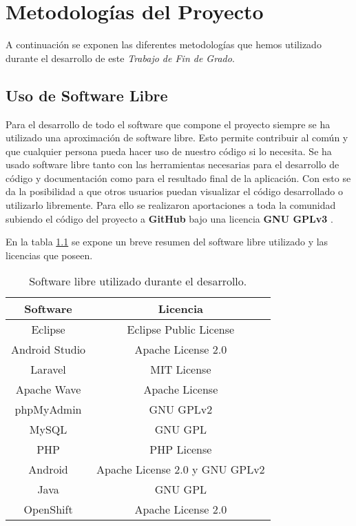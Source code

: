 \newpage
\thispagestyle{sectioned}
\chapter{Metodologías del Proyecto}

A continuación se exponen las diferentes metodologías que hemos utilizado durante el desarrollo de este \textit{Trabajo de Fin de Grado}.

\section{Uso de Software Libre}

Para el desarrollo de todo el software que compone el proyecto siempre se ha utilizado una aproximación de software libre. Esto permite contribuir al común y que cualquier persona pueda hacer uso de nuestro código si lo necesita. Se ha usado software libre tanto con las herramientas necesarias para el desarrollo de código y documentación como para el resultado final de la aplicación. Con esto se da la posibilidad a que otros usuarios puedan visualizar el código desarrollado o utilizarlo libremente. Para ello se realizaron aportaciones a toda la comunidad subiendo el código del proyecto a \textbf{GitHub} bajo una licencia \textbf{GNU GPLv3} \cite{ref:GPLv3}.

En la tabla \ref{fig:tableLicenses} se expone un breve resumen del software libre utilizado y las licencias que poseen.

\begin{table}[h]
\centering
\begin{tabular}{|c|c|}
\hline
{\bf Software} & {\bf Licencia}                 \\ \hline
Eclipse        & Eclipse Public License         \\ \hline
Android Studio & Apache License 2.0             \\ \hline
Laravel        & MIT License                    \\ \hline
Apache Wave    & Apache License                 \\ \hline
phpMyAdmin     & GNU GPLv2                      \\ \hline
MySQL          & GNU GPL                        \\ \hline
PHP            & PHP License                    \\ \hline
Android        & Apache License 2.0 y GNU GPLv2 \\ \hline
Java           & GNU GPL                        \\ \hline
OpenShift      & Apache License 2.0             \\ \hline
\end{tabular}
\caption{Software libre utilizado durante el desarrollo.}
\label{fig:tableLicenses}
\end{table}

